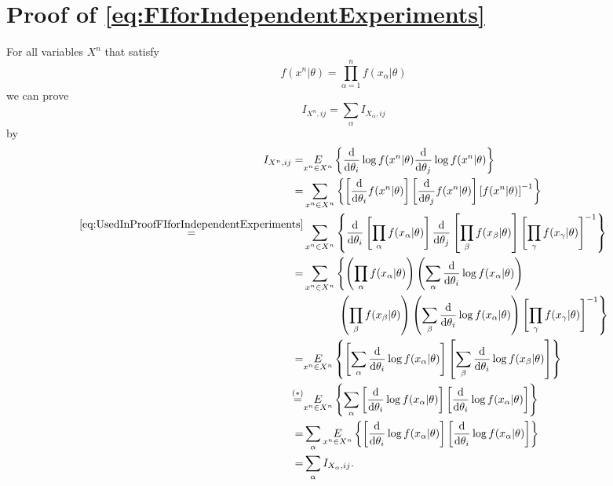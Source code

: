 \section{Proof of \cref{eq:FIforIndependentExperiments}}
\label{sec:ProofFIforIndependentExperiments}
For all variables $X^n$ that satisfy
\begin{equation}\label{eq:UsedInProofFIforIndependentExperiments}
	f(x^n|\theta) = \prod_{\alpha = 1}^n f(x_\alpha|\theta)
\end{equation} 
we can prove
\begin{equation}
	I_{X^n,ij} = \sum_\alpha I_{X_\alpha,ij}
\end{equation}
by
\begin{equation}
\begin{split}
	I_{X^n,ij} =& \underset{x^n \in X^n}{E} \left\{\frac{\mathrm{d}}{\mathrm{d}\theta_i}\log f(x^n|\theta) \frac{\mathrm{d}}{\mathrm{d}\theta_j}\log f(x^n|\theta)\right\}\\
	=& \sum_{x^n \in X^n} \left\{\left[\frac{\mathrm{d}}{\mathrm{d}\theta_i} f(x^n|\theta)\right] \left[\frac{\mathrm{d}}{\mathrm{d}\theta_j} f(x^n|\theta)\right]  \left[f(x^n|\theta)\right]^{-1} \right\}\\
	\stackrel{\ref{eq:UsedInProofFIforIndependentExperiments}}{=}& \sum_{x^n \in X^n} \left\{\frac{\mathrm{d}}{\mathrm{d}\theta_i} \left[\prod_\alpha f(x_\alpha|\theta)\right] \frac{\mathrm{d}}{\mathrm{d}\theta_j} \left[\prod_\beta f(x_\beta|\theta)\right] \left[ \prod_\gamma f(x_\gamma|\theta)\right]^{-1}\right\}\\
	=&\sum_{x^n \in X^n} \left\{\left(\prod_\alpha f(x_\alpha|\theta)\right)\left(\sum_\alpha \frac{\mathrm{d}}{\mathrm{d}\theta_i}\log f(x_\alpha|\theta)\right) \right. 
	\\
	&\qquad\quad\left.\left(\prod_\beta f(x_\beta|\theta)\right)\left(\sum_\beta \frac{\mathrm{d}}{\mathrm{d}\theta_i}\log f(x_\alpha|\theta)\right) \left[\prod_\gamma f(x_\gamma|\theta)\right]^{-1} \right\}\\
	=& \underset{x^n \in X^n}{E}\left\{ \left[\sum_\alpha\frac{\mathrm{d}}{\mathrm{d}\theta_i}\log f(x_\alpha|\theta)\right] \left[\sum_\beta\frac{\mathrm{d}}{\mathrm{d}\theta_i}\log f(x_\beta|\theta)\right]\right\}\\
	\stackrel{(*)}{=}& \underset{x^n \in X^n}{E} \left\{ \sum_\alpha \left[ \frac{\mathrm{d}}{\mathrm{d}\theta_i}\log f(x_\alpha|\theta)\right]\left[ \frac{\mathrm{d}}{\mathrm{d}\theta_i}\log f(x_\alpha|\theta)\right]\right\}\\
	=& \sum_\alpha \underset{x^n \in X^n}{E} \left\{\left[ \frac{\mathrm{d}}{\mathrm{d}\theta_i}\log f(x_\alpha|\theta)\right]\left[ \frac{\mathrm{d}}{\mathrm{d}\theta_i}\log f(x_\alpha|\theta)\right]\right\}\\
	=& \sum_\alpha I_{X_\alpha,ij}.
\end{split}
\end{equation}
